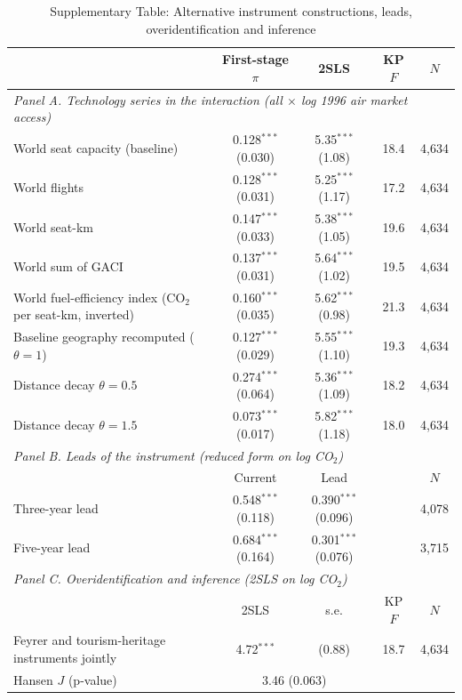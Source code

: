 \begin{table}[htbp]
\centering
\begin{threeparttable}
\caption{Supplementary Table: Alternative instrument constructions, leads, overidentification and inference}
\label{tab:exclusion2}
\scriptsize
\begin{tabular}{lcccc}
\toprule
 & First-stage $\pi$ & 2SLS & KP $F$ & $N$ \\
\midrule
\multicolumn{5}{l}{\textit{Panel A. Technology series in the interaction (all $\times$ log 1996 air market access)}} \\
  World seat capacity (baseline) & 0.128$^{***}$ (0.030) & 5.35$^{***}$ (1.08) & 18.4 & 4,634 \\
  World flights & 0.128$^{***}$ (0.031) & 5.25$^{***}$ (1.17) & 17.2 & 4,634 \\
  World seat-km & 0.147$^{***}$ (0.033) & 5.38$^{***}$ (1.05) & 19.6 & 4,634 \\
  World sum of GACI & 0.137$^{***}$ (0.031) & 5.64$^{***}$ (1.02) & 19.5 & 4,634 \\
  World fuel-efficiency index (CO$_2$ per seat-km, inverted) & 0.160$^{***}$ (0.035) & 5.62$^{***}$ (0.98) & 21.3 & 4,634 \\
  Baseline geography recomputed ($\theta = 1$) & 0.127$^{***}$ (0.029) & 5.55$^{***}$ (1.10) & 19.3 & 4,634 \\
  Distance decay $\theta = 0.5$ & 0.274$^{***}$ (0.064) & 5.36$^{***}$ (1.09) & 18.2 & 4,634 \\
  Distance decay $\theta = 1.5$ & 0.073$^{***}$ (0.017) & 5.82$^{***}$ (1.18) & 18.0 & 4,634 \\
\midrule
\multicolumn{5}{l}{\textit{Panel B. Leads of the instrument (reduced form on log CO$_2$)}} \\
 & Current & Lead & & $N$ \\
  Three-year lead & 0.548$^{***}$ (0.118) & 0.390$^{***}$ (0.096) & & 4,078 \\
  Five-year lead & 0.684$^{***}$ (0.164) & 0.301$^{***}$ (0.076) & & 3,715 \\
\midrule
\multicolumn{5}{l}{\textit{Panel C. Overidentification and inference (2SLS on log CO$_2$)}} \\
 & 2SLS & s.e. & KP $F$ & $N$ \\
  Feyrer and tourism-heritage instruments jointly & 4.72$^{***}$ & (0.88) & 18.7 & 4,634 \\
  \quad Hansen $J$ (p-value) & \multicolumn{2}{c}{3.46 (0.063)} & & \\

\end{tabular}
\end{threeparttable}
\end{table}

